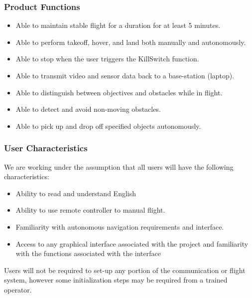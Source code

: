 \documentclass[onecolumn, draftclsnofoot,10pt, compsoc]{IEEEtran}
\begin{document}
\subsubsection{Product Functions}
\begin{itemize} 

\item Able to maintain stable flight for a duration for at least 5 minutes.

\item Able to perform takeoff, hover, and land both manually and autonomously.

\item Able to stop when the user triggers the KillSwitch function.
 
\item Able to transmit video and sensor data back to a base-station (laptop).
 
\item Able to distinguish between objectives and obstacles while in flight. 

\item Able to detect and avoid non-moving obstacles.

\item Able to pick up and drop off specified objects autonomously.
\end{itemize}



\subsubsection{User Characteristics}

We are working under the assumption that all users will have the following characteristics:
\begin{itemize}
    \item Ability to read and understand English
    \item Ability to use remote controller to manual flight. 
    \item Familiarity with autonomous navigation requirements and interface.
    \item Access to any graphical interface associated with the project and familiarity with the functions associated with the interface
\end{itemize}

Users will not be required to set-up any portion of the communication or flight system, however some initialization steps may be required from a trained operator. 
\end{document}
